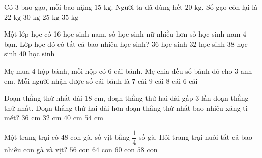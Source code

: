 \begin{ex} %
Có 3 bao gạo, mỗi bao nặng $15\text{ kg}$. Người ta đã dùng hết $20\text{ kg}$. Số gạo còn lại là
\choice
{$22\text{ kg}$}
{$30\text{ kg}$}
{\True $25\text{ kg}$}
{$35\text{ kg}$}
\end{ex}

\begin{ex} %
Một lớp học có 16 học sinh nam, số học sinh nữ nhiều hơn số học sinh nam 4 bạn. Lớp học đó có tất cả bao nhiêu học sinh?
\choice
{\True $36$ học sinh}
{$32$ học sinh}
{$38$ học sinh}
{$40$ học sinh}
\end{ex}

\begin{ex} %
Mẹ mua 4 hộp bánh, mỗi hộp có 6 cái bánh. Mẹ chia đều số bánh đó cho 3 anh em. Mỗi người nhận được số cái bánh là
\choice
{$7$ cái}
{$9$ cái}
{\True $8$ cái}
{$6$ cái}
\end{ex}

\begin{ex} %
Đoạn thẳng thứ nhất dài $18\text{ cm}$, đoạn thẳng thứ hai dài gấp 3 lần đoạn thẳng thứ nhất. Đoạn thẳng thứ hai dài hơn đoạn thẳng thứ nhất bao nhiêu xăng-ti-mét?
\choice
{\True $36\text{ cm}$}
{$32\text{ cm}$}
{$40\text{ cm}$}
{$54\text{ cm}$}
\end{ex}

\begin{ex} %
Một trang trại có 48 con gà, số vịt bằng $\dfrac{1}{4}$ số gà. Hỏi trang trại nuôi tất cả bao nhiêu con gà và vịt?
\choice
{$56$ con}
{$64$ con}
{\True $60$ con}
{$58$ con}
\end{ex}

